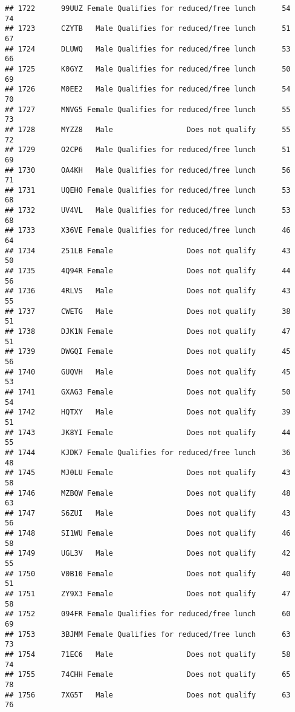 \documentclass[
]{article}
\begin{document}
\begin{verbatim}
## 1722      99UUZ Female Qualifies for reduced/free lunch      54       74
## 1723      CZYTB   Male Qualifies for reduced/free lunch      51       67
## 1724      DLUWQ   Male Qualifies for reduced/free lunch      53       66
## 1725      K0GYZ   Male Qualifies for reduced/free lunch      50       69
## 1726      M0EE2   Male Qualifies for reduced/free lunch      54       70
## 1727      MNVG5 Female Qualifies for reduced/free lunch      55       73
## 1728      MYZZ8   Male                 Does not qualify      55       72
## 1729      O2CP6   Male Qualifies for reduced/free lunch      51       69
## 1730      OA4KH   Male Qualifies for reduced/free lunch      56       71
## 1731      UQEHO Female Qualifies for reduced/free lunch      53       68
## 1732      UV4VL   Male Qualifies for reduced/free lunch      53       68
## 1733      X36VE Female Qualifies for reduced/free lunch      46       64
## 1734      251LB Female                 Does not qualify      43       50
## 1735      4Q94R Female                 Does not qualify      44       56
## 1736      4RLVS   Male                 Does not qualify      43       55
## 1737      CWETG   Male                 Does not qualify      38       51
## 1738      DJK1N Female                 Does not qualify      47       51
## 1739      DWGQI Female                 Does not qualify      45       56
## 1740      GUQVH   Male                 Does not qualify      45       53
## 1741      GXAG3 Female                 Does not qualify      50       54
## 1742      HQTXY   Male                 Does not qualify      39       51
## 1743      JK8YI Female                 Does not qualify      44       55
## 1744      KJDK7 Female Qualifies for reduced/free lunch      36       48
## 1745      MJ0LU Female                 Does not qualify      43       58
## 1746      MZBQW Female                 Does not qualify      48       63
## 1747      S6ZUI   Male                 Does not qualify      43       56
## 1748      SI1WU Female                 Does not qualify      46       58
## 1749      UGL3V   Male                 Does not qualify      42       55
## 1750      V0B10 Female                 Does not qualify      40       51
## 1751      ZY9X3 Female                 Does not qualify      47       58
## 1752      094FR Female Qualifies for reduced/free lunch      60       69
## 1753      3BJMM Female Qualifies for reduced/free lunch      63       73
## 1754      71EC6   Male                 Does not qualify      58       74
## 1755      74CHH Female                 Does not qualify      65       78
## 1756      7XG5T   Male                 Does not qualify      63       76

\end{verbatim}
\end{document}

